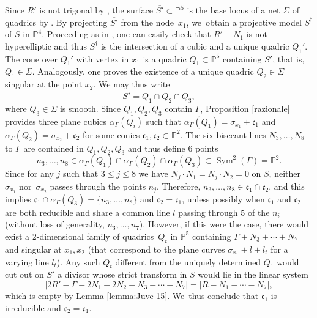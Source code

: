 \documentclass[11pt]{article}
\theoremstyle{plain}
\theoremstyle{definition}
\DeclareMathOperator{\Sym}{Sym}
\newcommand\PP{{\mathbb P}}
\begin{document}
Since $R'$ is not trigonal by \cite[Prop.\,5.6]{DL}, the surface $\overline{S'}\subset \PP^5$ is the base locus of a net $\Sigma$ of quadrics by \cite[Ex.\,VIII.22(11)]{Be}. By projecting $\overline{S'}$ from the node~$x_1$, we~obtain a projective model $S^\dagger$ of $S$ in $\mathbb P^4$. Proceeding as in \cite[Prop.\,5.6]{DL}, one can easily check that $R'-N_1$ is not hyperelliptic and thus $S^\dagger$ is the intersection of a cubic and a unique quadric $Q_1'$. The cone over $Q_1'$ with vertex in $x_1$ is a quadric $Q_1\subset \PP^5$ containing $\overline{S'}$, that is, $Q_1\in \Sigma$. Analogously, one proves the existence of a unique quadric $Q_2\in \Sigma$ singular at the point $x_2$.
We may thus write
\[
\overline{S'}=Q_1\cap Q_2\cap Q_3,
\]
where $Q_3\in \Sigma$ is smooth. Since $Q_1,Q_2,Q_3$ contain $\Gamma$, Proposition \ref{razionale} provides three plane cubics $\alpha_\Gamma(Q_i)$ such that $\alpha_\Gamma(Q_1)=\sigma_{x_1}+\mathfrak{c}_1$ and $\alpha_\Gamma(Q_2)=\sigma_{x_2}+\mathfrak{c}_2$ for some conics $\mathfrak{c}_1,\mathfrak{c}_2\subset \PP^2$. The six bisecant lines $N_3,\ldots,N_8$ to $\Gamma$ are contained in $Q_1,Q_2,Q_3$ and thus define $6$ points
\[
n_3,\ldots,n_8\in\alpha_\Gamma(Q_1)\cap \alpha_\Gamma(Q_2)\cap\alpha_\Gamma(Q_3)\subset\Sym^2(\Gamma)=\PP^2.
\]
Since for any $j$ such that $3\leq j\leq 8$ we have $N_j\cdot N_1=N_j\cdot N_2=0$ on $S$, neither~$\sigma_{x_1}$ nor~$\sigma_{x_2}$ passes through the points $n_j$. Therefore, $n_3,\ldots,n_8\in \mathfrak{c}_1\cap \mathfrak{c}_2$, and this implies $\mathfrak{c}_1\cap \alpha_{\Gamma}(Q_3)=\{ n_3,\ldots,n_8 \}$ and $\mathfrak{c}_2=\mathfrak{c}_1$, unless possibly when $\mathfrak{c}_1$ and $\mathfrak{c}_2$ are both reducible and share a common line $l$ passing through $5$ of the $n_i$ (without loss of generality, $n_3,\ldots,n_7$). However, if this were the case, there would exist a $2$-dimensional family of quadrics~$Q_t$ in $\PP^5$ containing $\Gamma+N_3+\cdots+N_7$ and singular at $x_1, x_2$ (that correspond to the plane curves $\sigma_{x_1}+l+l_t$ for a varying line $l_t$). Any such $Q_t$ different from the uniquely determined $Q_1$ would cut out on $\overline{S'}$ a divisor whose strict transform in $S$ would lie in the linear system
\begin{equation*}
|2R'-\Gamma- 2N_1-2N_2-N_3-\cdots-N_7|=|R-N_1-\cdots-N_7|,
\end{equation*}
which is empty by Lemma \ref{lemma:Juve-15}. We~thus conclude that $\mathfrak{c}_1$ is irreducible and $\mathfrak{c}_2=\mathfrak{c}_1$.
\end{document}
